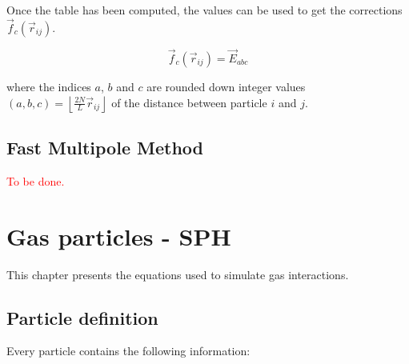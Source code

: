 \documentclass[a4paper,10pt]{report}
\begin{document}
Once the table has been computed, the values can be used to get the corrections $\vec{f}_c(\vec{r}_{ij})$.

\begin{equation}
 \vec{f}_c(\vec{r}_{ij}) = \vec{E}_{abc}
\end{equation}

where the indices $a$, $b$ and $c$ are rounded down integer values $(a,b,c) = \left\lfloor\frac{2N}{L}
\vec{r}_{ij}\right\rfloor$ of the distance between particle $i$ and $j$.

\section{Fast Multipole Method}


\textcolor{red}{To be done.}







\chapter{Gas particles - SPH}
\label{chap:SPH}

This chapter presents the equations used to simulate gas interactions.

\section{Particle definition}
Every particle contains the following information:
\end{document}
